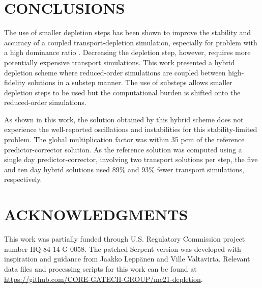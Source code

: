 \documentclass[letterpaper]{mc2021}
\begin{document}
\section{CONCLUSIONS}

The use of smaller depletion steps has been shown to improve the stability
and accuracy of a coupled transport-depletion simulation, especially for
problem with a high dominance ratio
\cite{Kotlyar2013UsePredictorCorrector,Densmore2013StabilityAnalysisBurnup}.
Decreasing the depletion step, however, requires more potentially expensive transport
simulations.
This work presented a hybrid depletion scheme where reduced-order simulations
are coupled between high-fidelity solutions in a substep manner.
The use of substeps allows smaller depletion steps to be used but the computational burden
is shifted onto the reduced-order simulations.

As shown in this work, the solution obtained by this hybrid scheme does not experience
the well-reported oscillations and instabilities for this stability-limited problem.
The global multiplication factor was within 35 pcm of the reference predictor-corrector
solution.
As the reference solution was computed using a single day predictor-corrector, involving
two transport solutions per step, the five and ten day hybrid solutions used 89\% and 93\%
fewer transport simulations, respectively.

\section*{ACKNOWLEDGMENTS}
This work was partially funded through U.S. Regulatory Commission project number
HQ-84-14-G-0058.
The patched Serpent version was developed with inspiration and guidance from Jaakko Lepp\"anen
and Ville Valtavirta.
Relevant data files and processing scripts for this work can be found at
\url{https://github.com/CORE-GATECH-GROUP/mc21-depletion}.

\setlength{\baselineskip}{12pt}


\end{document}

